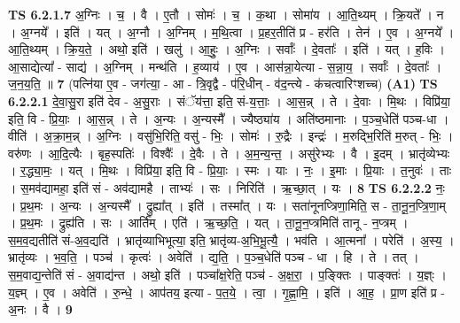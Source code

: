 \documentclass[17pt]{extarticle}
\begin{document}
                  \newline
                                \textbf{ TS 6.2.1.7} \newline
                  अ॒ग्निः । च॒ । वै । ए॒तौ । सोमः॑ । च॒ । क॒था । सोमा॑य । आ॒ति॒थ्यम् । क्रि॒यते᳚ । न । अ॒ग्नये᳚ । इति॑ । यत् । अ॒ग्नौ । अ॒ग्निम् । म॒थि॒त्वा । प्र॒हर॒तीति॑ प्र - हर॑ति । तेन॑ । ए॒व । अ॒ग्नये᳚ । आ॒ति॒थ्यम् । क्रि॒य॒ते॒ । अथो॒ इति॑ । खलु॑ । आ॒हुः॒ । अ॒ग्निः । सर्वाः᳚ । दे॒वताः᳚ । इति॑ । यत् । ह॒विः । आ॒साद्येत्या᳚ - साद्य॑ । अ॒ग्निम् । मन्थ॑ति । ह॒व्याय॑ । ए॒व । आस॑न्ना॒येत्या - स॒न्ना॒य॒ । सर्वाः᳚ । दे॒वताः᳚ । ज॒न॒य॒ति॒ ॥ \textbf{  7 } \newline
                  \newline
                      (पत्नि॑या ए॒व - जग॑त्या॒ - आ - त्रि॒वृद्वै - प॑रि॒धीन् - व॑द॒न्त्ये - क॑चत्वारिꣳशच्च)  \textbf{(A1)} \newline \newline
                                \textbf{ TS 6.2.2.1} \newline
                  दे॒वा॒सु॒रा इति॑ देव - अ॒सु॒राः । संॅय॑त्ता॒ इति॒ सं-य॒त्ताः॒ । आ॒स॒न्न् । ते । दे॒वाः । मि॒थः । विप्रि॑या॒ इति॒ वि - प्रि॒याः॒ । आ॒स॒न्न् । ते । अ॒न्यः । अ॒न्यस्मै᳚ । ज्यैष्ठ्या॑य । अति॑ष्ठमानाः । प॒ञ्च॒धेति॑ पञ्च-धा । वीति॑ । अ॒क्रा॒म॒न्न् । अ॒ग्निः । वसु॑भि॒रिति॒ वसु॑ - भिः॒ । सोमः॑ । रु॒द्रैः । इन्द्रः॑ । म॒रुद्भि॒रिति॑ म॒रुत् - भिः॒ । वरु॑णः । आ॒दि॒त्यैः । बृह॒स्पतिः॑ । विश्वैः᳚ । दे॒वैः । ते । अ॒म॒न्य॒न्त॒ । असु॑रेभ्यः । वै । इ॒दम् । भ्रातृ॑व्येभ्यः । र॒द्ध्या॒मः॒ । यत् । मि॒थः । विप्रि॑या॒ इति॒ वि - प्रि॒याः॒ । स्मः । याः । नः॒ । इ॒माः । प्रि॒याः । त॒नुवः॑ । ताः । स॒मव॑द्यामहा॒ इति॑ सं - अव॑द्यामहै । ताभ्यः॑ । सः । निरिति॑ । ऋ॒च्छा॒त् । यः । \textbf{  8} \newline
                  \newline
                                \textbf{ TS 6.2.2.2} \newline
                  नः॒ । प्र॒थ॒मः । अ॒न्यः । अ॒न्यस्मै᳚ । द्रुह्या᳚त् । इति॑ । तस्मा᳚त् । यः । सता॑नूनप्त्रिणा॒मिति॒ स - ता॒नू॒न॒प्त्रि॒णा॒म् । प्र॒थ॒मः । द्रुह्य॑ति । सः । आर्ति᳚म् । एति॑ । ऋ॒च्छ॒ति॒ । यत् । ता॒नू॒न॒प्त्रमिति॑ तानू - न॒प्त्रम् । स॒म॒व॒द्यतीति॑ सं-अ॒व॒द्यति॑ । भ्रातृ॑व्याभिभूत्या॒ इति॒ भ्रातृ॑व्य-अ॒भि॒भू॒त्यै॒ । भव॑ति । आ॒त्मना᳚ । परेति॑ । अ॒स्य॒ । भ्रातृ॑व्यः । भ॒व॒ति॒ । पञ्च॑ । कृत्वः॑ । अवेति॑ । द्य॒ति॒ । प॒ञ्च॒धेति॑ पञ्च - धा । हि । ते । तत् । स॒म॒वाद्य॒न्तेति॑ सं - अ॒वाद्य॑न्त । अथो॒ इति॑ । पञ्चा᳚क्ष॒रेति॒ पञ्च॑ - अ॒क्ष॒रा॒ । प॒ङ्क्तिः । पाङ्क्तः॑ । य॒ज्ञ्ः । य॒ज्ञ्म् । ए॒व । अवेति॑ । रु॒न्धे॒ । आप॑तय॒ इत्या - प॒त॒ये॒ । त्वा॒ । गृ॒ह्णा॒मि॒ । इति॑ । आ॒ह॒ । प्रा॒ण इति॑ प्र - अ॒नः । वै । \textbf{  9} \newline
\end{document}
